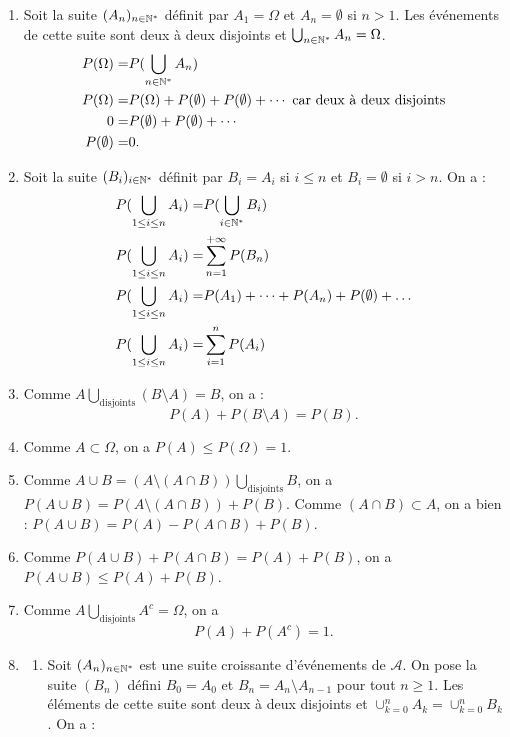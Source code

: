 \documentclass{book}
\begin{document}
\begin{Demonstration}
\begin{enumerate}
\item Soit la suite $(A_n)_{n\in\mathbb{N}^*}$ définit par $A_1=\Omega$ et $A_n=\emptyset$ si $n>1$. Les événements de cette suite sont deux à deux disjoints et $\bigcup_{n\in\mathbb{N}^*}A_n=\Omega$.
$$\begin{aligned}
P(\Omega)=&P(\bigcup_{n\in\mathbb{N}^*}A_n)\\
P(\Omega)=&P(\Omega)+P(\emptyset)+P(\emptyset)+\cdots \text{ car deux à deux disjoints}\\
0=&P(\emptyset)+P(\emptyset)+\cdots\\
P(\emptyset)=&0.
\end{aligned}$$
\item Soit la suite $(B_i)_{i\in\mathbb{N}^*}$ définit par $B_i=A_i$ si $i\leq n$ et $B_i=\emptyset$ si $i>n$. On a :
$$\begin{aligned}
P(\bigcup_{1\leq i \leq n}A_i)=&P(\bigcup_{i\in\mathbb{N}^*}B_i)\\
P(\bigcup_{1\leq i \leq n}A_i)=&\sum_{n=1}^{+\infty}P(B_n)\\
P(\bigcup_{1\leq i \leq n}A_i)=&P(A_1)+\dots+P(A_n)+P(\emptyset)+\dots \\
P(\bigcup_{1\leq i \leq n}A_i)=&\sum_{i=1}^{n}P(A_i)
\end{aligned}$$
\item Comme  $A \bigcup\limits_{\text{disjoints}}(B\setminus A)=B$, on a :
$$ P(A)+P(B\setminus A)=P(B).$$
\item Comme $A\subset \Omega$, on a $P(A)\leq P(\Omega)=1$.
\item Comme $A\cup B=(A\setminus (A\cap B))\bigcup\limits_{\text{disjoints}}B$, on a $P(A\cup B)=P(A\setminus (A\cap B))+P(B).$ Comme $(A\cap B)\subset A$, on a bien : 
 $P(A\cup B)=P(A)- P(A\cap B)+P(B).$
\item Comme $P(A\cup B)+ P(A\cap B)=P(A)+P(B)$, on a $P(A\cup B)\leq P(A)+P(B)$.
\item Comme $A \bigcup\limits_{\text{disjoints}}A^c=\Omega$, on a 
$$P(A)+P(A^c)=1.$$
\item {}
\begin{enumerate}
\item  Soit $(A_n)_{n\in\mathbb{N}^*}$ est une suite croissante d'événements de $\mathcal{A}$. On pose la suite $(B_n)$ défini $B_0=A_0$ et $B_n =A_{n}\setminus A_{n-1}$ pour tout $n\geq 1$. Les éléments de cette suite sont deux à deux disjoints et $\cup_{k=0}^n A_k = \cup_{k=0}^n B_k$. On a :

\end{enumerate}
\end{enumerate}
\end{Demonstration}
\end{document}
